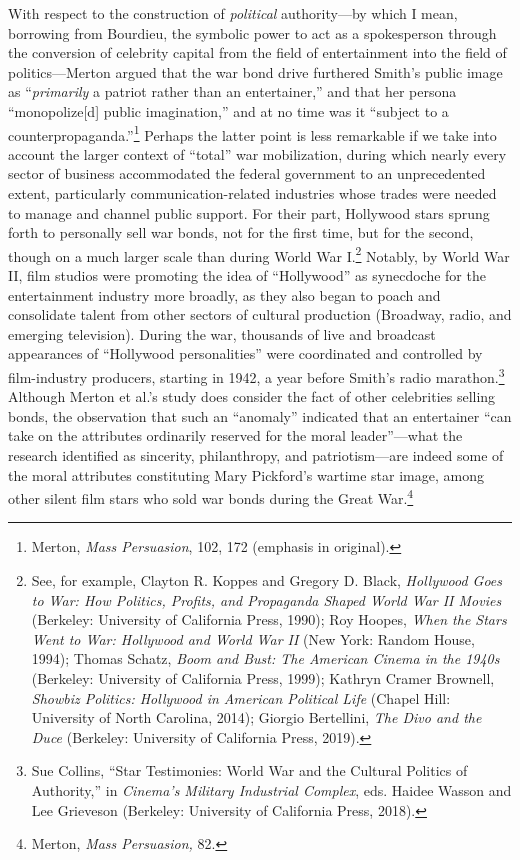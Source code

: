 \documentclass{tufte-handout}
\begin{document}
With respect to the construction of \emph{political} authority---by
which I mean, borrowing from Bourdieu, the symbolic power to act as a
spokesperson through the conversion of celebrity capital from the field
of entertainment into the field of politics---Merton argued that the war
bond drive furthered Smith's public image as ``\emph{primarily} a
patriot rather than an entertainer,'' and that her persona
``monopolize{[}d{]} public imagination,'' and at no time was it
``subject to a counterpropaganda.''\footnote{Merton, \emph{Mass
  Persuasion}, 102, 172 (emphasis in original).} Perhaps the latter
point is less remarkable if we take into account the larger context of
``total'' war mobilization, during which nearly every sector of business
accommodated the federal government to an unprecedented extent,
particularly communication-related industries whose trades were needed
to manage and channel public support. For their part, Hollywood stars
sprung forth to personally sell war bonds, not for the first time, but
for the second, though on a much larger scale than during World War
I.\footnote{See, for example, Clayton R. Koppes and Gregory D. Black,
  \emph{Hollywood Goes to War: How Politics, Profits, and Propaganda
  Shaped World War II Movies} (Berkeley: University of California Press,
  1990); Roy Hoopes, \emph{When the Stars Went to War: Hollywood and
  World War II} (New York: Random House, 1994); Thomas Schatz,
  \emph{Boom and Bust: The American Cinema in the 1940s} (Berkeley:
  University of California Press, 1999); Kathryn Cramer Brownell,
  \emph{Showbiz Politics: Hollywood in American Political Life} (Chapel
  Hill: University of North Carolina, 2014); Giorgio Bertellini,
  \emph{The Divo and the Duce} (Berkeley: University of California
  Press, 2019).} Notably, by World War II, film studios were promoting
the idea of ``Hollywood'' as synecdoche for the entertainment industry
more broadly, as they also began to poach and consolidate talent from
other sectors of cultural production (Broadway, radio, and emerging
television). During the war, thousands of live and broadcast appearances
of ``Hollywood personalities'' were coordinated and controlled by
film-industry producers, starting in 1942, a year before Smith's radio
marathon.\footnote{Sue Collins, ``Star Testimonies: World War and the
  Cultural Politics of Authority,'' in \emph{Cinema's Military
  Industrial Complex}, eds. Haidee Wasson and Lee Grieveson (Berkeley:
  University of California Press, 2018).} Although Merton et al.'s study
does consider the fact of other celebrities selling bonds, the
observation that such an ``anomaly'' indicated that an entertainer ``can
take on the attributes ordinarily reserved for the moral leader''---what
the research identified as sincerity, philanthropy, and patriotism---are
indeed some of the moral attributes constituting Mary Pickford's wartime
star image, among other silent film stars who sold war bonds during the
Great War.\footnote{Merton, \emph{Mass Persuasion,} 82.}
\end{document}
